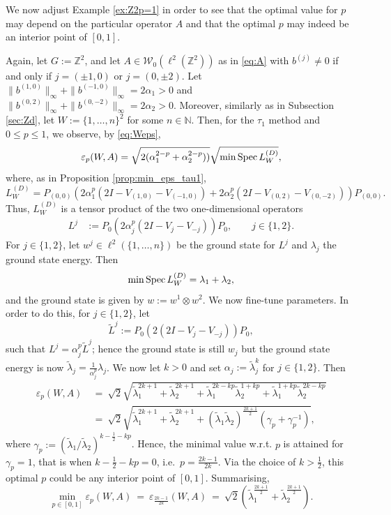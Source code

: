 \documentclass{article}
\newcommand\Marko[1]{\marginpar{\textcolor{blue}{\tt #1}}}
\newcommand\N{{\mathbb N}}
\newcommand\W{{\mathcal W}}
\newcommand\Z{{\mathbb Z}}
\newcommand\eps{{\varepsilon}}
\newcommand\Spec{{\rm Spec}\,}  %
\newenvironment{example}
 {\par\noindent\refstepcounter{theorem}{\bf Example \thetheorem\ }}
 {\raisebox{1mm}{\framebox{}}\par\pagebreak[2]}
\numberwithin{equation}{section}   %
\numberwithin{figure}{section}  %
\begin{document}
We now adjust Example \ref{ex:Z2p=1} in order to see that the optimal value for $p$ may depend on the particular operator $A$ and that the optimal $p$ may indeed be an interior point of $[0,1]$. 
\begin{example}
    Again, let $G:=\Z^2$, and let $A\in \W_0(\ell^2(\Z^2))$ as in \eqref{eq:A} with $b^{(j)}\neq 0$ if and only if $j=(\pm 1,0)$ or $j=(0,\pm 2)$. Let $\|b^{(1,0)}\|_\infty + \|b^{(-1,0)}\|_\infty=2\alpha_1>0$ and $\|b^{(0,2)}\|_\infty + \|b^{(0,-2)}\|_\infty=2\alpha_2>0$. Moreover, similarly as in Subsection \ref{sec:Zd}, let $W:=\{1,\ldots,n\}^2$ for some $n\in\N$. Then, for the $\tau_1$ method and $0\leq p\leq 1$, we observe, by \eqref{eq:Weps},
    \[\eps_p(W,A) = \sqrt{2(\alpha_1^{2-p} + \alpha_2^{2-p}))} \sqrt{\min \Spec L_W^{(D)}},\]
    where, as in Proposition \ref{prop:min_eps_tau1}, 
    \[L_W^{(D)} = P_{(0,0)}\left(2\alpha_1^p(2I-V_{(1,0)} - V_{(-1,0)}) + 2\alpha_2^p (2I-V_{(0,2)}-V_{(0,-2)})\right)P_{(0,0)}.\]
    Thus, $L_W^{(D)}$ is a tensor product of the two one-dimensional operators
    \begin{align*}
        L^j & := P_0 (2\alpha_j^p (2I-V_j-V_{-j}))P_0, \qquad j\in\{1,2\}.
    \end{align*}
    For $j\in\{1,2\}$, let $w^j\in \ell^2(\{1,\ldots,n\})$ be the ground state for $L^j$ and $\lambda_j$ the ground state energy.
    Then 
    \[\min \Spec L_W^{(D)} = \lambda_1+\lambda_2,\]
    and the ground state is given by $w:=w^1\otimes w^2$.
    We now fine-tune parameters. In order to do this, for $j\in\{1,2\}$, let 
    \[\widetilde{L}^j:=P_0 (2(2I-V_j-V_{-j}))P_0,\]
    such that $L^j = \alpha_j^p \widetilde{L}^j$; hence the ground state is still $w_j$ but the ground state energy is now $\widetilde{\lambda}_j = \frac{1}{\alpha_j^p} \lambda_j$.
    We now let $k>0$ and set $\alpha_j:= \widetilde{\lambda}_j^k$ for $j\in\{1,2\}$.
    Then 
    \begin{align*}
    \eps_p(W,A) &\ =\ \sqrt{2} \sqrt{\widetilde{\lambda}_1^{2k+1} + \widetilde{\lambda}_2^{2k+1} +\widetilde{\lambda}_1^{2k-kp} \widetilde{\lambda}_2^{1+kp} + \widetilde{\lambda}_1^{1+kp} \widetilde{\lambda}_2^{2k-kp}}\\
    &\ =\ \sqrt{2}\sqrt{\widetilde{\lambda}_1^{2k+1} + \widetilde{\lambda}_2^{2k+1} + (\widetilde{\lambda}_1\widetilde{\lambda}_2)^{\frac{2k+1}2}(\gamma_p+\gamma_p^{-1})},
    \end{align*}
    where $\gamma_p:=(\widetilde{\lambda}_1/\widetilde{\lambda}_2)^{k-\frac 12 - kp}$.
    Hence, the minimal value w.r.t. $p$ is attained for $\gamma_p=1$, that is when $k-\frac 12-kp=0$, i.e.~$p=\frac{2k-1}{2k}$. Via the choice of $k>\frac 12$, this optimal $p$ could be any interior point of $[0,1]$. Summarising,
    \[
    \min_{p\in[0,1]}\eps_p(W,A)\ =\ \eps_{\frac{2k-1}{2k}}(W,A)\ =\ \sqrt{2} \left(\widetilde{\lambda}_1^{\frac{2k+1}{2}} + \widetilde{\lambda}_2^{\frac{2k+1}{2}}\right).
    \]
    \end{example}
\end{document}
